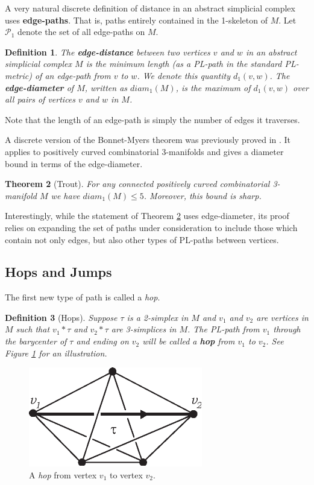 \documentclass[12pt]{article}
\newtheorem{thm}{Theorem}[section]
\newtheorem{dfn}[thm]{Definition}
\begin{document}
A very natural discrete definition of distance in an abstract simplicial complex uses \textbf{edge-paths}. That is, paths entirely contained in the 1-skeleton of $M$. Let $\mathcal{P}_1$ denote the set of all edge-paths on $M$.

\begin{dfn}The \textbf{edge-distance} between two vertices $v$ and $w$ in an abstract simplicial complex $M$ is the minimum length (as a PL-path in the standard PL-metric) of an edge-path from $v$ to $w$. We denote this quantity $d_1(v,w)$. The \textbf{edge-diameter} of $M$, written as $diam_1(M)$, is the maximum of $d_1(v,w)$ over all pairs of vertices $v$ and $w$ in $M$. 
\end{dfn}

\noindent Note that the length of an edge-path is simply the number of edges it traverses.

A discrete version of the Bonnet-Myers theorem was previously proved in \cite{Trout10}. It applies to positively curved combinatorial 3-manifolds and gives a diameter bound in terms of the edge-diameter.

\begin{thm}[Trout] For any connected positively curved combinatorial 3-manifold $M$ we have $diam_1(M)\leq 5$. Moreover, this bound is sharp.
\label{thm:discrete_BM}
\end{thm}

\noindent Interestingly, while the statement of Theorem \ref{thm:discrete_BM} uses edge-diameter, its proof relies on expanding the set of paths under consideration to include those which contain not only edges, but also other types of PL-paths between vertices.

\subsection{Hops and Jumps}
The first new type of path is called a {\em hop}.

\begin{dfn}[Hops] Suppose $\tau$ is a 2-simplex in $M$ and $v_1$ and $v_2$ are vertices in $M$ such that $v_1*\tau$ and $v_2*\tau$ are 3-simplices in $M$. The PL-path from $v_1$ through the barycenter of $\tau$ and ending on $v_2$ will be called a \textbf{hop} from $v_1$ to $v_2$. See Figure \ref{fig:hop} for an illustration.
\end{dfn}

\begin{figure}
	\centering
		\includegraphics[width=0.23\linewidth]{figures/hops.pdf}
    \caption{A {\em hop} from vertex $v_1$ to vertex $v_2$.}
    	\label{fig:hop}
\end{figure}
\end{document}
